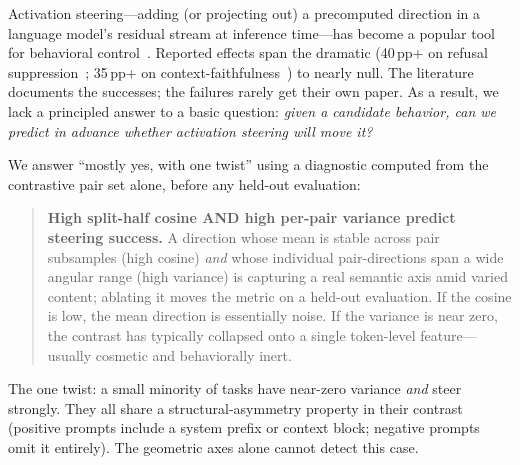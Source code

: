 \documentclass{article}
\begin{document}
Activation steering---adding (or projecting out) a precomputed
direction in a language model's residual stream at inference
time---has become a popular tool for behavioral
control~\citep{turner2023activation,zou2023representation,
li2023iti,rimsky2023steering,arditi2024refusal,yang2026contextfocus}.
Reported effects span the dramatic (40\,pp+ on refusal
suppression~\citep{arditi2024refusal}; 35\,pp+ on
context-faithfulness~\citep{yang2026contextfocus}) to nearly null.
The literature documents the successes; the failures rarely get
their own paper. As a result, we lack a principled answer to a
basic question: \emph{given a candidate behavior, can we predict in
advance whether activation steering will move it?}

We answer ``mostly yes, with one twist'' using a diagnostic computed
from the contrastive pair set alone, before any held-out evaluation:

\begin{quote}
\textbf{High split-half cosine AND high per-pair variance predict
steering success.} A direction whose mean is stable across pair
subsamples (high cosine) \emph{and} whose individual pair-directions
span a wide angular range (high variance) is capturing a real
semantic axis amid varied content; ablating it moves the metric on a
held-out evaluation. If the cosine is low, the mean direction is
essentially noise. If the variance is near zero, the contrast has
typically collapsed onto a single token-level feature---usually
cosmetic and behaviorally inert.
\end{quote}

The one twist: a small minority of tasks have near-zero variance
\emph{and} steer strongly. They all share a structural-asymmetry
property in their contrast (positive prompts include a system
prefix or context block; negative prompts omit it entirely). The
geometric axes alone cannot detect this case.
\end{document}
